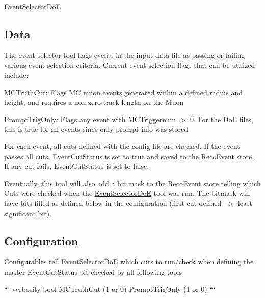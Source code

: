 \hyperlink{classEventSelectorDoE}{Event\-Selector\-Do\-E}

\subsection*{Data}

The event selector tool flags events in the input data file as passing or failing various event selection criteria. Current event selection flags that can be utilized include\-:
\begin{DoxyItemize}
\item M\-C\-Truth\-Cut\-: Flags M\-C muon events generated within a defined radius and height, and requires a non-\/zero track length on the Muon
\item Prompt\-Trig\-Only\-: Flags any event with M\-C\-Triggernum $>$ 0. For the Do\-E files, this is true for all events since only prompt info was stored
\end{DoxyItemize}

For each event, all cuts defined with the config file are checked. If the event passes all cuts, Event\-Cut\-Status is set to true and saved to the Reco\-Event store. If any cut fails, Event\-Cut\-Status is set to false.

Eventually, this tool will also add a bit mask to the Reco\-Event store telling which Cuts were checked when the \hyperlink{classEventSelectorDoE}{Event\-Selector\-Do\-E} tool was run. The bitmask will have bits filled as defined below in the configuration (first cut defined -\/$>$ least significant bit).

\subsection*{Configuration}

Configurables tell \hyperlink{classEventSelectorDoE}{Event\-Selector\-Do\-E} which cuts to run/check when defining the master Event\-Cut\-Status bit checked by all following tools

``` verbosity bool M\-C\-Truth\-Cut (1 or 0) Prompt\-Trig\-Only (1 or 0) ``` 